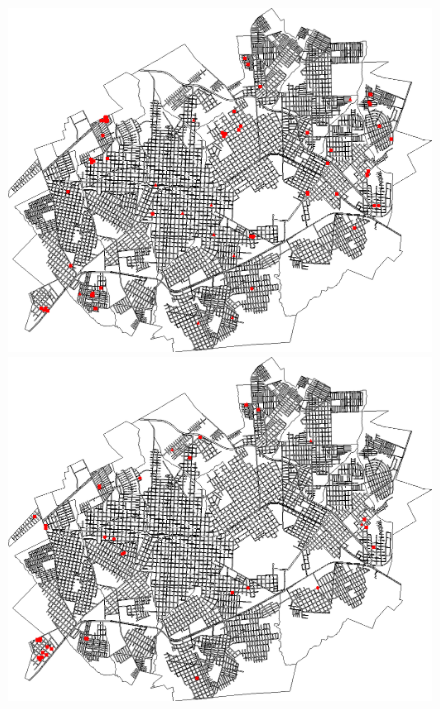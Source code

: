 \begin{figure}[H]
\begin{minipage}{.5\textwidth}
    \captionsetup{labelformat=empty}
  \end{minipage}
  \begin{minipage}{.5\textwidth}
    \centering
    \includegraphics[width=1.0\textwidth]{Figuras/Resultados/0002/Saidas_GPU_BIT/MonteCarlo_0/Simulacao_0/Casos/00080.png}
    \captionsetup{labelformat=empty}
  \end{minipage}%
  \centering
  \begin{minipage}{.5\textwidth}
    \centering
    \includegraphics[width=1.0\textwidth]{Figuras/Resultados/0002/Saidas_GPU_BIT/MonteCarlo_0/Simulacao_0/Casos/00120.png}

\end{minipage}
\end{figure}
